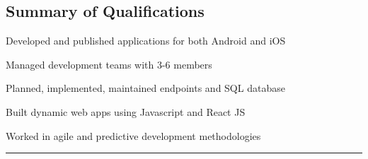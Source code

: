 \documentclass[]{johns_resume_style}
\begin{document}
%
%

%
%


\noindent
\begin{minipage}[t]{.33\textwidth}
\raggedright
{}

\end{minipage}%
\begin{minipage}[t]{.66\textwidth\hspace*{.2cm}}
\vspace*{-.8cm}

\subsection{Summary of Qualifications} 

\begin{tightemize}
    \vspace{\topsep} %
    \item Developed and published applications for both Android and iOS
    \item Managed development teams with 3-6 members
    \item Planned, implemented, maintained endpoints and SQL database 
    \item Built dynamic web apps using Javascript and React JS
    \item Worked in agile and predictive development methodologies 

\end{tightemize}



\end{minipage}
 


\par\noindent\rule{\textwidth}{0.4pt}




%
%
\end{document}
